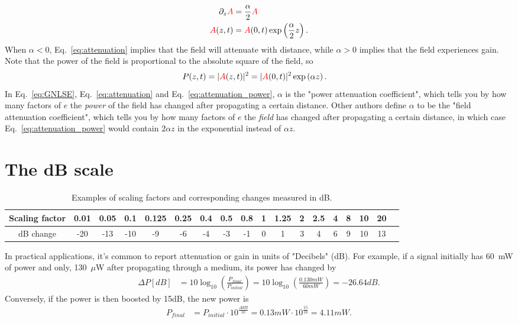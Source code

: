 \begin{align}
    \label{eq:attenuation}
    \partial_z\textcolor{red}{A} &= \frac{\alpha}{2} \textcolor{red}{A} \\ \nonumber
    \textcolor{red}{A}(z,t)&=\textcolor{red}{A}(0,t)\exp\left( \frac{\alpha}{2}z \right). 
\end{align}
When $\alpha<0$, Eq.~\ref{eq:attenuation} implies that the field will attenuate with distance, while $\alpha>0$ implies that the field experiences gain. Note that the power of the field is proportional to the absolute square of the field, so
\begin{align}
    \label{eq:attenuation_power}
    P(z,t)=|\textcolor{red}{A}(z,t)|^2&=|\textcolor{red}{A}(0,t)|^2 \exp\left( \alpha z \right). 
\end{align}
In Eq.~\ref{eq:GNLSE}, Eq.~\ref{eq:attenuation} and Eq.~\ref{eq:attenuation_power}, $\alpha$ is the "power attenuation coefficient", which tells you by how many factors of $e$ the \emph{power} of the field has changed after propagating a certain distance. Other authors define $\alpha$ to be the "field attenuation coefficient", which tells you by how many factors of $e$ the \emph{field} has changed after propagating a certain distance, in which case Eq.~\ref{eq:attenuation_power} would contain $2\alpha z$ in the exponential instead of $\alpha z$. 

\section{The dB scale}
\begin{table}[]
    \centering
    \begin{tabular}{ c|c|c|c|c|c|c|c|c|c|c|c|c|c|c|c|c|c }
\label{tab:dB}
 Scaling factor &0.01&0.05 & 0.1 &0.125 &0.25&0.4 &0.5 & 0.8&1&1.25 &2 &2.5 &4 &8 &10 &20 & \\  \hline
 dB change & -20 &-13 &-10 & -9&  -6&-4& -3&-1&0&1 &3 &4 &6 &9 & 10&13 
\end{tabular}
    \caption{Examples of scaling factors and corresponding changes measured in dB.}
    \label{tab:dB}
\end{table}
In practical applications, it's common to report attenuation or gain in units of "Decibels" (dB). For example, if a signal initially has 60~mW of power and only, 130~$\mu$W after propagating through a medium, its power has changed by
\begin{align}
    \Delta P [dB] &= 10 \log_{10}\left(\frac{P_{final}}{P_{initial}} \right)= 10 \log_{10}\left(\frac{0.130 mW}{60 mW} \right) = -26.64 dB.
\end{align}
Conversely, if the power is then boosted by 15dB, the new power is
\begin{align}
\label{eq:boost}
    P_{final}&=P_{initial}\cdot10^{\frac{\Delta dB}{10}}=0.13mW\cdot10^{\frac{15}{10}} = 4.11 mW.
\end{align}


